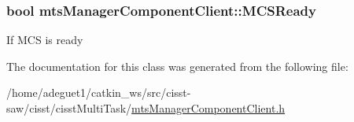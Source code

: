 \hypertarget{classmts_manager_component_client_abb3a505ba4d4fc2ac5f53c4ba4046b8e}{
\subsubsection[{M\-C\-S\-Ready}]{\setlength{\rightskip}{0pt plus 5cm}bool mts\-Manager\-Component\-Client\-::\-M\-C\-S\-Ready\hspace{0.3cm}{\ttfamily [protected]}}}\label{classmts_manager_component_client_abb3a505ba4d4fc2ac5f53c4ba4046b8e}
If M\-C\-S is ready 

The documentation for this class was generated from the following file\-:\begin{DoxyCompactItemize}
\item 
/home/adeguet1/catkin\-\_\-ws/src/cisst-\/saw/cisst/cisst\-Multi\-Task/\hyperlink{mts_manager_component_client_8h}{mts\-Manager\-Component\-Client.\-h}\end{DoxyCompactItemize}
